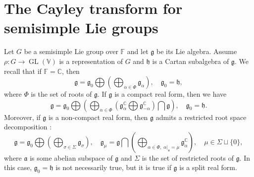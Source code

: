 \documentclass[11pt,reqno]{amsart}
\DeclareMathOperator{\GL}{GL}
\newcommand{\RR}{\mathbb{R}} %
\newcommand{\CC}{\mathbb{C}} %
\newcommand{\FF}{\mathbb{F}} %
\begin{document}
\section{The Cayley transform for semisimple Lie groups}\label{sec:semisimple}
%
% 
%
%
Let $G$ be a semisimple Lie group over $\FF$ and let $\mathfrak{g}$ be its Lie algebra.  Assume $\rho: G \to \GL(\mathbb{V})$ is a representation of $G$ and $\mathfrak{h}$ is a Cartan subalgebra of $\mathfrak{g}$.  We recall that if $\mathbb{F} = \mathbb{C}$,   then 
\[
\mathfrak{g} = \mathfrak{g}_0 \bigoplus \left( \bigoplus_{\alpha\in \Phi} \mathfrak{g}_{\alpha} \right),\quad \mathfrak{g}_0 = \mathfrak{h},
\]
where $\Phi$ is the set of roots of $\mathfrak{g}$.  If $\mathfrak{g}$ is a compact real form,  then we have 
\[
\mathfrak{g} =\mathfrak{g}_0  \bigoplus \left( \bigoplus_{\alpha\in \Phi} \left( \mathfrak{g}^{\mathbb{C}}_{\alpha} \bigoplus \mathfrak{g}^{\mathbb{C}}_{-\alpha} \right) \bigcap \mathfrak{g} \right),\quad \mathfrak{g}_0 = \mathfrak{h}.
\]
Moreover,  if $\mathfrak{g}$ is a non-compact real form,  then $\mathfrak{g}$ admits a restricted root space decomposition \cite[Proposition~6.40 and Equation~(6.48b)]{Knapp02}:
\[
\mathfrak{g} = \mathfrak{g}_0 \bigoplus \left( \bigoplus_{\sigma \in \Sigma} \mathfrak{g}_{\sigma} \right),\quad \mathfrak{g}_{\mu} = \mathfrak{g} \bigcap \left(  \bigoplus_{ \alpha \in \Phi,  \; \alpha|_{\mathfrak{a}}  = \mu } \mathfrak{g}^{\mathbb{C}}_{\alpha}\right),\quad  \mu \in \Sigma \sqcup \{0\},
\]
where $\mathfrak{a}$ is some abelian subspace of $\mathfrak{g}$ and $\Sigma$ is the set of restricted roots of $\mathfrak{g}$.  In this case,  $\mathfrak{g}_0 = \mathfrak{h}$ is not necessarily true,  but it is true if $\mathfrak{g}$ is a split real form.
\end{document}
